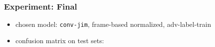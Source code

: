 \begin{frame}
  \frametitle{Experiment: Final}
  \begin{itemize}
      \item chosen model: \texttt{conv-jim}, frame-based normalized, adv-label-train
      \item confusion matrix on test sets:
  \end{itemize}
  \vspace{-0.5cm}
  \begin{figure}[!ht]
    \centering
    \qquad
  \end{figure}
\end{frame}